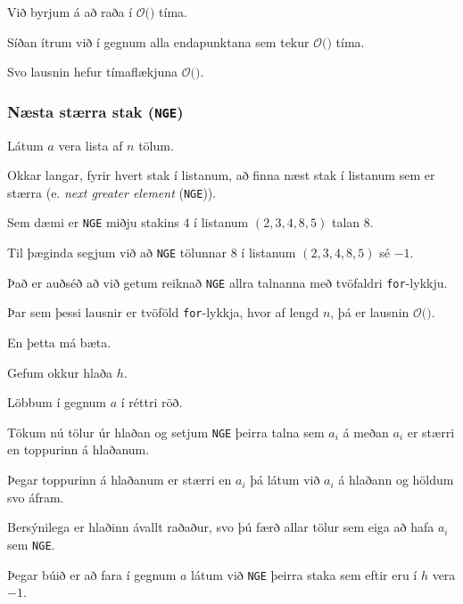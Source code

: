 {
}

{
	{
		\item<1-> Við byrjum á að raða í $\mathcal{O}($$)$ tíma.
		\item<3-> Síðan ítrum við í gegnum alla endapunktana sem tekur $\mathcal{O}($$)$ tíma.
		\item<5-> Svo lausnin hefur tímaflækjuna $\mathcal{O}($\onslide<6->{$n \log n$}$)$.
	}
}

{
	\frametitle{Næsta stærra stak (\texttt{NGE})}
	{
		\item<1-> Látum $a$ vera lista af $n$ tölum.
		\item<2-> Okkar langar, fyrir hvert stak í listanum, að finna næst stak í listanum sem er stærra (e. \emph{next greater element} (\texttt{NGE})).
		\item<3-> Sem dæmi er \texttt{NGE} miðju stakins $4$ í listanum $(2, 3, 4, 8, 5)$ talan $8$.
		\item<4-> Til þæginda segjum við að \texttt{NGE} tölunnar $8$ í listanum $(2, 3, 4, 8, 5)$ sé $-1$.
		\item<5-> Það er auðséð að við getum reiknað \texttt{NGE} allra talnanna með tvöfaldri \texttt{for}-lykkju.
	}
}

{
}

{
	{
		\item<1-> Þar sem þessi lausnir er tvöföld \texttt{for}-lykkja, hvor af lengd $n$, þá er lausnin $\mathcal{O}($\onslide<2->{$n^2$}$)$.
	}
}

{
	{
		\item<1-> En þetta má bæta.
		\item<2-> Gefum okkur hlaða $h$. 
		\item<3-> Löbbum í gegnum $a$ í réttri röð.
		\item<4-> Tökum nú tölur úr hlaðan og setjum \texttt{NGE} þeirra talna sem $a_i$ á meðan $a_i$ er stærri en toppurinn á hlaðanum.
		\item<5-> Þegar toppurinn á hlaðanum er stærri en $a_i$ þá látum við $a_i$ á hlaðann og höldum svo áfram.
		\item<6-> Bersýnilega er hlaðinn ávallt raðaður, svo þú færð allar tölur sem eiga að hafa $a_i$ sem \texttt{NGE}.
		\item<7-> Þegar búið er að fara í gegnum $a$ látum við \texttt{NGE} þeirra staka sem eftir eru í $h$ vera $-1$.
	}
}

